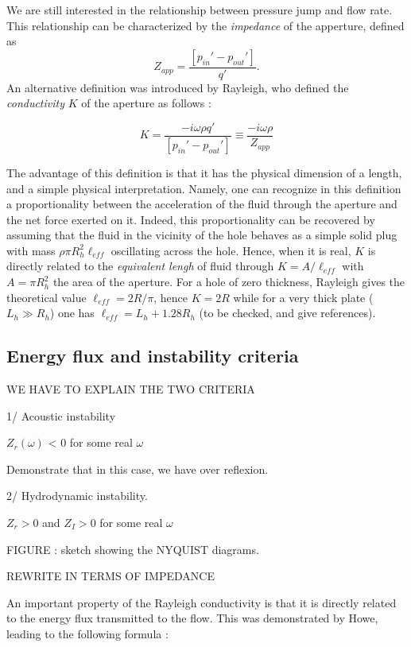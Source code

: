 \documentclass{jfm}
\begin{document}
We are still interested in the relationship between pressure jump and flow rate. This relationship can be characterized by the {\em impedance} of the apperture, defined as 
$$
Z_{app} = \frac{[p_{in}'-  p_{out}']}{q'}.
$$
An alternative definition was introduced by Rayleigh, who defined the {\em conductivity} $K$ of the aperture as follows :

$$
K = \frac{-i \omega \rho q'}{[p_{in}'-  p_{out}']} \equiv \frac{- i \omega \rho}{Z_{app}}  
$$

The advantage of this definition is that it has the physical dimension of a length, and a simple physical interpretation. Namely, one can recognize in this definition a proportionality between the acceleration of the fluid through the aperture and the net force exerted on it. Indeed, this proportionality can be recovered by assuming that the fluid in the vicinity of the hole behaves as a simple solid plug with mass $\rho \pi R_h^2 \ell_{eff}$ oscillating across the hole. Hence, when it is real, $K$ is directly related to the {\em equivalent lengh} of fluid
through $K = A/\ell_{eff}$ with $A = \pi R_h^2$ the area of the aperture. 
For a hole of zero thickness, Rayleigh gives the theoretical value $\ell_{eff} = 2 R/ \pi$, hence $K = 2R$
while for a very thick plate ($L_h\gg R_h$) one has $\ell_{eff} = L_h + 1.28 R_h$  (to be checked, and give references). 


\subsection{Energy flux and instability criteria}


WE HAVE TO EXPLAIN THE TWO CRITERIA

1/ Acoustic instability 

$Z_r(\omega)$ < 0 for some real $\omega$

Demonstrate that in this case, we have over reflexion.




2/ Hydrodynamic instability.

$Z_r>0$ and $Z_I>0$ for some real $\omega$


FIGURE : sketch showing the NYQUIST diagrams.






REWRITE IN TERMS OF IMPEDANCE 

An important property of the Rayleigh conductivity is that it is directly related to the energy flux transmitted to the flow. This was demonstrated by Howe, leading to the following formula :
\end{document}
